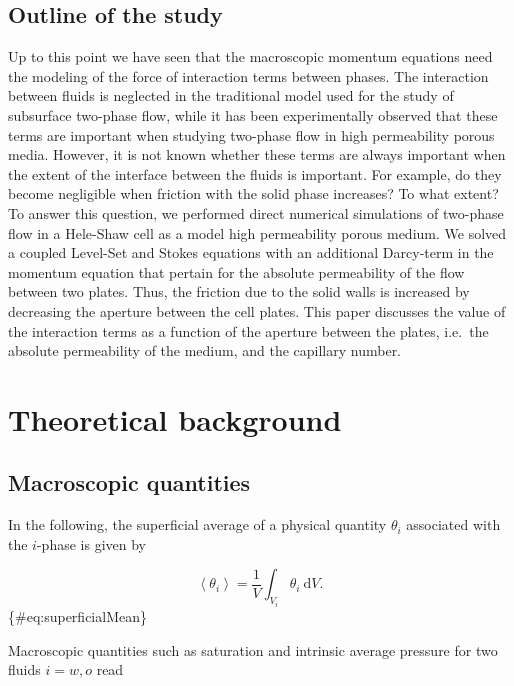 \documentclass[]{article}
\begin{document}
\hypertarget{outline-of-the-study}{%
\subsection{Outline of the study}\label{outline-of-the-study}}

Up to this point we have seen that the macroscopic momentum equations
need the modeling of the force of interaction terms between phases. The
interaction between fluids is neglected in the traditional model used
for the study of subsurface two-phase flow, while it has been
experimentally observed that these terms are important when studying
two-phase flow in high permeability porous media. However, it is not
known whether these terms are always important when the extent of the
interface between the fluids is important. For example, do they become
negligible when friction with the solid phase increases? To what extent?
To answer this question, we performed direct numerical simulations of
two-phase flow in a Hele-Shaw cell as a model high permeability porous
medium. We solved a coupled Level-Set and Stokes equations with an
additional Darcy-term in the momentum equation that pertain for the
absolute permeability of the flow between two plates. Thus, the friction
due to the solid walls is increased by decreasing the aperture between
the cell plates. This paper discusses the value of the interaction terms
as a function of the aperture between the plates, i.e.~the absolute
permeability of the medium, and the capillary number.

\hypertarget{theoretical-background}{%
\section{Theoretical background}\label{theoretical-background}}

\hypertarget{macroscopic-quantities}{%
\subsection{Macroscopic quantities}\label{macroscopic-quantities}}

In the following, the superficial average of a physical quantity
\(\theta_i\) associated with the \(i\)-phase is given by

\[
\left\langle \theta_{i}\right\rangle =\frac{1}{V}\int_{V_{i}}\theta_{i}\:\mathrm{d}V.
\] \{\#eq:superficialMean\}

Macroscopic quantities such as saturation and intrinsic average pressure
for two fluids \(i=w,o\) read
\end{document}
